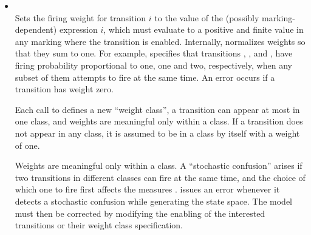 \begin{private}
\begin{itemize}
\item
{}\\
Sets the firing weight for transition $i$ to the value of the
(possibly marking-dependent)  expression $i$,
which must evaluate to a positive and finite value in any marking
where the transition is enabled.
Internally, {\smart} normalizes weights so that they sum to one.
For example,  specifies that transitions
, , and , have firing probability proportional
to one, one and two, respectively, when any subset of them attempts
to fire at the same time.
An error occurs if a transition has weight zero.

Each call to  defines a new ``weight class'',
a transition can appear at most in one class,
and weights are meaningful only within a class.
If a transition does not appear in any class, it is assumed to be in a class
by itself with a weight of one.

Weights are meaningful only within a class.  A ``stochastic
confusion'' arises if two transitions in different classes can fire at
the same time, and the choice of which one to fire first affects the
measures \cite{1996MASCOTS-StochasticConfusion}.
{\smart} issues an error whenever
it detects a stochastic confusion while generating the state space.
The model must then be corrected by modifying the enabling of the
interested transitions or their weight class specification.




\end{itemize}
\end{private}
